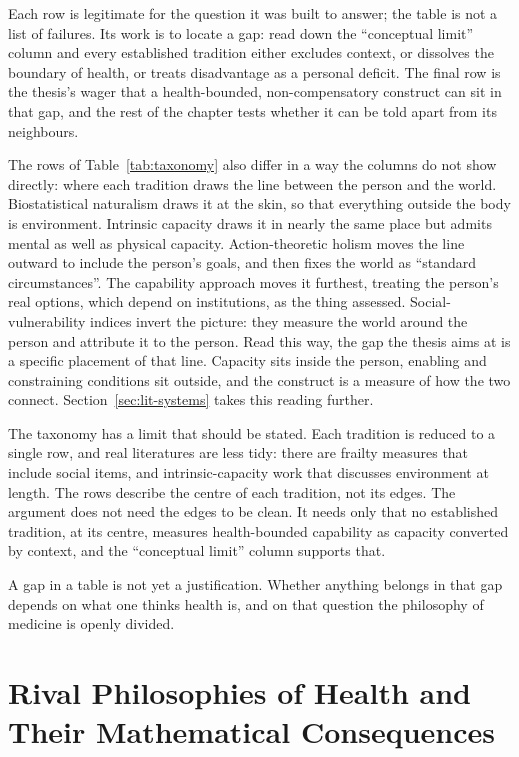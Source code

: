 \begin{reading}
Each row is legitimate for the question it was built to answer; the table is not a
list of failures. Its work is to locate a gap: read down the ``conceptual limit''
column and every established tradition either excludes context, or dissolves the
boundary of health, or treats disadvantage as a personal deficit. The final row is
the thesis's wager that a health-bounded, non-compensatory construct can sit in that
gap, and the rest of the chapter tests whether it can be told apart from its
neighbours.
\end{reading}

The rows of Table~\ref{tab:taxonomy} also differ in a way the columns do not
show directly: where each tradition draws the line between the person and the
world. Biostatistical naturalism draws it at the skin, so that everything
outside the body is environment. Intrinsic capacity draws it in nearly the same
place but admits mental as well as physical capacity. Action-theoretic holism
moves the line outward to include the person's goals, and then fixes the world
as ``standard circumstances''. The capability approach moves it furthest,
treating the person's real options, which depend on institutions, as the thing
assessed. Social-vulnerability indices invert the picture: they measure the
world around the person and attribute it to the person. Read this way, the gap
the thesis aims at is a specific placement of that line. Capacity sits inside
the person, enabling and constraining conditions sit outside, and the construct
is a measure of how the two connect. Section~\ref{sec:lit-systems} takes this
reading further.

The taxonomy has a limit that should be stated. Each tradition is reduced to a
single row, and real literatures are less tidy: there are frailty measures
that include social items, and intrinsic-capacity work that discusses
environment at length. The rows describe the centre of each tradition, not its
edges. The argument does not need the edges to be clean. It needs only that no
established tradition, at its centre, measures health-bounded capability as
capacity converted by context, and the ``conceptual limit'' column supports
that.

A gap in a table is not yet a justification. Whether anything belongs in that
gap depends on what one thinks health is, and on that question the philosophy
of medicine is openly divided.

\section{Rival Philosophies of Health and Their Mathematical Consequences}
\label{sec:lit-philosophies}

